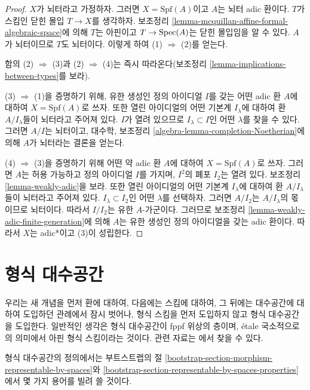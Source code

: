 \begin{proof}
$X$가 뇌터라고 가정하자. 그러면 $X = \text{Spf}(A)$이고 $A$는
뇌터 adic 환이다. $T$가 스킴인 닫힌 몰입 $T \to X$를 생각하자.
보조정리 \ref{lemma-mcquillan-affine-formal-algebraic-space}에 의해
$T$는 아핀이고 $T \to \mathop{\mathrm{Spec}}(A)$는 닫힌 몰입임을 알 수 있다.
$A$가 뇌터이므로 $T$도 뇌터이다. 이렇게 하여
(1) $\Rightarrow$ (2)를 얻는다.

\medskip\noindent
함의 (2) $\Rightarrow$ (3)과 (2) $\Rightarrow$ (4)는 즉시
따라온다(보조정리 \ref{lemma-implications-between-types}를 보라).

\medskip\noindent
(3) $\Rightarrow$ (1)을 증명하기 위해, 유한 생성인 정의 아이디얼
$I$를 갖는 어떤 adic 환 $A$에 대하여 $X = \text{Spf}(A)$로 쓰자.
또한 열린 아이디얼의 어떤 기본계 $I_\lambda$에 대하여 환
$A/I_\lambda$들이 뇌터라고 주어져 있다. $I$가 열려 있으므로
$I_\lambda \subset I$인 어떤 $\lambda$를 찾을 수 있다. 그러면
$A/I$는 뇌터이고, 대수학, 보조정리
\ref{algebra-lemma-completion-Noetherian}에 의해 $A$가 뇌터라는 결론을
얻는다.

\medskip\noindent
(4) $\Rightarrow$ (3)을 증명하기 위해 어떤 약 adic 환 $A$에 대하여
$X = \text{Spf}(A)$로 쓰자. 그러면 $A$는 허용 가능하고 정의
아이디얼 $I$를 가지며, $I^2$의 폐포 $I_2$는 열려 있다. 보조정리
\ref{lemma-weakly-adic}을 보라. 또한 열린 아이디얼의 어떤 기본계
$I_\lambda$에 대하여 환 $A/I_\lambda$들이 뇌터라고 주어져 있다.
$I_\lambda \subset I_2$인 어떤 $\lambda$를 선택하자. 그러면
$A/I_2$는 $A/I_\lambda$의 몫이므로 뇌터이다. 따라서 $I/I_2$는
유한 $A$-가군이다. 그러므로 보조정리
\ref{lemma-weakly-adic-finite-generation}에 의해 $A$는 유한 생성인
정의 아이디얼을 갖는 adic 환이다. 따라서 $X$는 adic*이고 (3)이
성립한다.
\end{proof}

\section{형식 대수공간}
\label{section-formal-algebraic-spaces}

\noindent
우리는 새 개념을 먼저 환에 대하여, 다음에는 스킴에 대하여, 그 뒤에는
대수공간에 대하여 도입하던 관례에서 잠시 벗어나, 형식 스킴을 먼저
도입하지 않고 형식 대수공간을 도입한다. 일반적인 생각은 형식
대수공간이 fppf 위상의 층이며, \'etale 국소적으로 \cite{BVGD}의
의미에서 아핀 형식 스킴이라는 것이다. 관련 자료는
\cite{Yasuda}에서 찾을 수 있다.

\medskip\noindent
형식 대수공간의 정의에서는 부트스트랩의 절
\ref{bootstrap-section-morphism-representable-by-spaces}와
\ref{bootstrap-section-representable-by-spaces-properties}에서
몇 가지 용어를 빌려 쓸 것이다.

